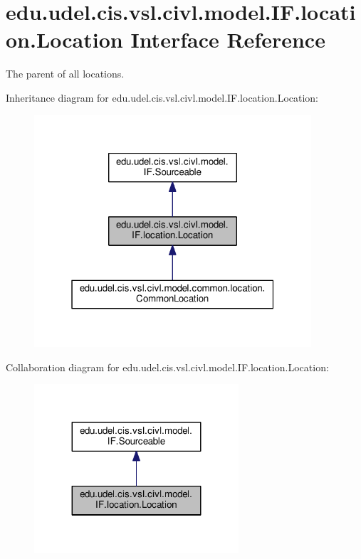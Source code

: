 \hypertarget{interfaceedu_1_1udel_1_1cis_1_1vsl_1_1civl_1_1model_1_1IF_1_1location_1_1Location}{}\section{edu.\+udel.\+cis.\+vsl.\+civl.\+model.\+I\+F.\+location.\+Location Interface Reference}
\label{interfaceedu_1_1udel_1_1cis_1_1vsl_1_1civl_1_1model_1_1IF_1_1location_1_1Location}


The parent of all locations.  




Inheritance diagram for edu.\+udel.\+cis.\+vsl.\+civl.\+model.\+I\+F.\+location.\+Location\+:
\nopagebreak
\begin{figure}[H]
\begin{center}
\leavevmode
\includegraphics[width=292pt]{interfaceedu_1_1udel_1_1cis_1_1vsl_1_1civl_1_1model_1_1IF_1_1location_1_1Location__inherit__graph}
\end{center}
\end{figure}


Collaboration diagram for edu.\+udel.\+cis.\+vsl.\+civl.\+model.\+I\+F.\+location.\+Location\+:
\nopagebreak
\begin{figure}[H]
\begin{center}
\leavevmode
\includegraphics[width=215pt]{interfaceedu_1_1udel_1_1cis_1_1vsl_1_1civl_1_1model_1_1IF_1_1location_1_1Location__coll__graph}
\end{center}
\end{figure}
